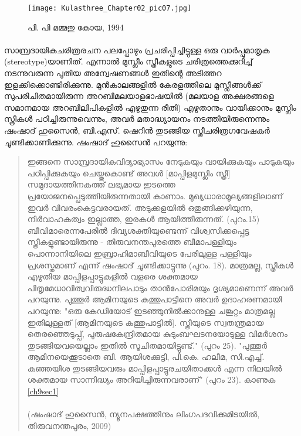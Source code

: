 \begin{figure}[h]
\begin{center}
\texttt{[image: Kulasthree\_Chapter02\_pic07.jpg]}
\end{center}
\caption*{പി. പി മമ്മതു കോയ, 1994}
\end{figure}

\label{ch2box5} %
\begin{tcolorbox}[%
  breakable, %
  arc=0mm, 
  left=1pt, right = 1pt, 
  boxrule=0mm,
  colback = {blue!10}, %
] 

\paragraph{} സാമ്പ്രദായികചരിത്രരചന പലപ്പോഴും പ്രചരിപ്പിച്ചിട്ടുള്ള ഒരു വാർപ്പുമാതൃക (stereotype)യാണിത്. എന്നാൽ മുസ്ലീം സ്ത്രീകളുടെ ചരിത്രത്തെക്കുറിച്ച് നടന്നുവരുന്ന പുതിയ അന്വേഷണങ്ങൾ ഇതിന്റെ അടിത്തറ ഇളക്കിക്കൊണ്ടിരിക്കുന്നു. മുൻകാലങ്ങളിൽ കേരളത്തിലെ മുസ്ലീങ്ങൾക്ക് സുപരിചിതമായിരുന്ന അറബിമലയാളഭാഷയിൽ (മലയാള അക്ഷരങ്ങളെ സമാനമായ അറബിലിപികളിൽ എഴുതുന്ന രീതി) എഴുതാനും വായിക്കാനും മുസ്ലിം സ്ത്രീകൾ പഠിച്ചിരുന്നുവെന്നും, അവർ മതാദ്ധ്യായനം നടത്തിയിരുന്നെന്നും ഷംഷാദ് ഹുസൈൻ, ബി.എസ്. ഷെറിൻ തുടങ്ങിയ സ്ത്രീചരിത്രഗവേഷകർ ചൂണ്ടിക്കാണിക്കുന്നു. ഷംഷാദ് ഹുസൈൻ പറയുന്നു:

\begin{quotation}
\noindent ഇങ്ങനെ സാമ്പ്രദായികവിദ്യാഭ്യാസം നേടുകയും വായിക്കുകയും പാടുകയും പഠിപ്പിക്കുകയും ചെയ്തുകൊണ്ട് അവൾ [മാപ്പിളമുസ്ലിം സ്ത്രീ] സമുദായത്തിനകത്ത് ലഭ്യമായ ഇടത്തെ പ്രയോജനപ്പെടുത്തിയിരുന്നതായി കാണാം. മുഖ്യധാരാമൂല്യങ്ങളിലാണ് ഇവർ വിവരംകെട്ടവരായത്. അടുക്കളയിൽ ഒതുങ്ങിക്കഴിയുന്ന, നിർവാഹകത്വം ഇല്ലാത്ത, ഇരകൾ ആയിത്തീരുന്നത്. (പുറം.15) ബീവിമാരെന്നപേരിൽ ദിവ്യശക്തിയുണ്ടെന്ന് വിശ്വസിക്കപ്പെട്ട സ്ത്രീകളുണ്ടായിരുന്നു - തിരുവനന്തപുരത്തെ ബീമാപള്ളിയും പൊന്നാനിയിലെ ഇബ്രാഹിമാബീവിയുടെ പേരിലുള്ള പള്ളിയും പ്രശസ്തമാണ് എന്ന് ഷംഷാദ് ചൂണ്ടിക്കാട്ടുന്നു (പുറം. 18). മാത്രമല്ല, സ്ത്രീകൾ എഴുതിയ മാപ്പിളപ്പാട്ടുകളിൽ വളരെ ശക്തമായ പിതൃമേധാവിത്വവിരുദ്ധനിലപാടും താൻപോരിമയും ദൃശ്യമാണെന്ന് അവർ പറയുന്നു. പുത്തൂർ ആമിനയുടെ കത്തുപാട്ടിനെ അവർ ഉദാഹരണമായി പറയുന്നു: "ഒരു കേഡിയോട് ഇടഞ്ഞുനിൽക്കാനുള്ള ചങ്കൂറ്റം മാത്രമല്ല ഇതിലുള്ളത് [ആമിനയുടെ കത്തുപാട്ടിൽ]. സ്ത്രീയുടെ സ്വതന്ത്രമായ തെരഞ്ഞെടുപ്പ്, പുരുഷകേന്ദ്രിതമായ കുടുംബഘടനയോടുള്ള വിമർശനം തുടങ്ങിയവയെല്ലാം ഇതിൽ സൂചിതമായിട്ടുണ്ട്." (പുറം 25). "പുത്തൂർ ആമിനയെക്കൂടാതെ ബി. ആയിശക്കുട്ടി, പി.കെ. ഹലീമ, സി.എച്ച്. കുഞ്ഞയിശ തുടങ്ങിയവരും മാപ്പിളപ്പാട്ടുരചയിതാക്കൾ എന്ന നിലയിൽ ശക്തമായ സാന്നിദ്ധ്യം അറിയിച്ചിരുന്നവരാണ്" (പുറം 23). കാണുക \ref{ch9sec1} \\
\\(ഷംഷാദ് ഹുസൈൻ, ന്യൂനപക്ഷത്തിനും ലിംഗപദവിക്കുമിടയിൽ, തിരുവനന്തപുരം, 2009)

\end{quotation}
\end{tcolorbox}

